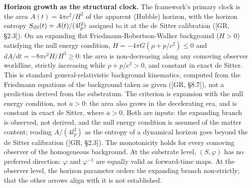 \documentclass[
]{article}
\begin{document}
\textbf{Horizon growth as the structural clock.} The framework's primary
clock is the area \(A(t) = 4\pi c^2/H^2\) of the apparent (Hubble)
horizon, with the horizon entropy \(S_{\rm dS}(t) = A(t)/(4 l_p^2)\)
assigned to it at the de Sitter calibration ({[}GR, §2.3{]}). On an
expanding flat Friedmann-Robertson-Walker background (\(H > 0\))
satisfying the null energy condition,
\(\dot H = -4\pi G(\rho + p/c^2) \leq 0\) and
\(dA/dt = -8\pi c^2\dot H/H^3 \geq 0\): the area is non-decreasing along
any comoving observer worldline, strictly increasing while
\(\rho + p/c^2 > 0\), and constant in exact de Sitter. This is standard
general-relativistic background kinematics, computed from the Friedmann
equations of the background taken as given ({[}GR, §8.7{]}), not a
prediction derived from the substratum. The criterion is expansion with
the null energy condition, not \(\ddot a > 0\): the area also grows in
the decelerating era, and is constant in exact de Sitter, where
\(\ddot a > 0\). Both are inputs: the expanding branch is observed, not
derived, and the null energy condition is assumed of the matter content;
reading \(A/(4 l_p^2)\) as the entropy of a dynamical horizon goes
beyond the de Sitter calibration ({[}GR, §2.3{]}). The monotonicity
holds for every comoving observer of the homogeneous background. At the
substrate level, \((S, \varphi)\) has no preferred direction:
\(\varphi\) and \(\varphi^{-1}\) are equally valid as forward-time maps.
At the observer level, the horizon parameter orders the expanding branch
non-strictly; that the other arrows align with it is not established.
\end{document}

